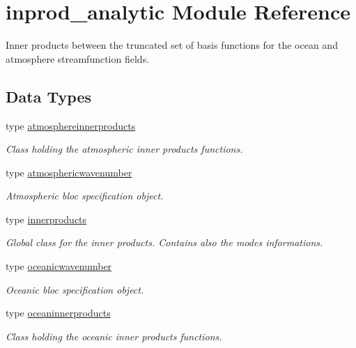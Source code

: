\hypertarget{namespaceinprod__analytic}{}\section{inprod\+\_\+analytic Module Reference}
\label{namespaceinprod__analytic}


Inner products between the truncated set of basis functions for the ocean and atmosphere streamfunction fields.  


\subsection*{Data Types}
\begin{DoxyCompactItemize}
\item 
type \hyperlink{structinprod__analytic_1_1atmosphereinnerproducts}{atmosphereinnerproducts}
\begin{DoxyCompactList}\small\item\em Class holding the atmospheric inner products functions. \end{DoxyCompactList}\item 
type \hyperlink{structinprod__analytic_1_1atmosphericwavenumber}{atmosphericwavenumber}
\begin{DoxyCompactList}\small\item\em Atmospheric bloc specification object. \end{DoxyCompactList}\item 
type \hyperlink{structinprod__analytic_1_1innerproducts}{innerproducts}
\begin{DoxyCompactList}\small\item\em Global class for the inner products. Contains also the modes informations. \end{DoxyCompactList}\item 
type \hyperlink{structinprod__analytic_1_1oceanicwavenumber}{oceanicwavenumber}
\begin{DoxyCompactList}\small\item\em Oceanic bloc specification object. \end{DoxyCompactList}\item 
type \hyperlink{structinprod__analytic_1_1oceaninnerproducts}{oceaninnerproducts}
\begin{DoxyCompactList}\small\item\em Class holding the oceanic inner products functions. \end{DoxyCompactList}\end{DoxyCompactItemize}
